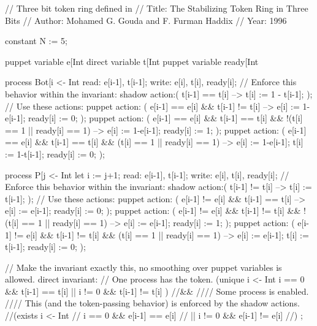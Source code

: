 \begin{code}
// Three bit token ring defined in
// Title: The Stabilizing Token Ring in Three Bits
// Author: Mohamed G. Gouda and F. Furman Haddix
// Year: 1996

constant N := 5;

puppet variable e[Int %
direct variable t[Int %
puppet variable ready[Int %

process Bot[i <- Int %
{
  read:  e[i-1], t[i-1];
  write: e[i], t[i], ready[i];
  // Enforce this behavior within the invariant:
  shadow action:( t[i-1] == t[i] --> t[i] := 1 - t[i-1]; );
  // Use these actions:
  puppet action:
    ( e[i-1] == e[i] && t[i-1] != t[i]
      --> e[i] := 1-e[i-1]; ready[i] := 0;
    );
  puppet action:
    ( e[i-1] == e[i] && t[i-1] == t[i] && !(t[i] == 1 || ready[i] == 1)
      --> e[i] := 1-e[i-1]; ready[i] := 1;
    );
  puppet action:
    ( e[i-1] == e[i] && t[i-1] == t[i] &&  (t[i] == 1 || ready[i] == 1)
      --> e[i] := 1-e[i-1]; t[i] := 1-t[i-1]; ready[i] := 0;
    );
}

process P[j <- Int %
{
  let i := j+1;
  read:  e[i-1], t[i-1];
  write: e[i], t[i], ready[i];
  // Enforce this behavior within the invariant:
  shadow action:( t[i-1] != t[i] --> t[i] := t[i-1]; );
  // Use these actions:
  puppet action:
    ( e[i-1] != e[i] && t[i-1] == t[i]
      --> e[i] := e[i-1]; ready[i] := 0;
    );
  puppet action:
    ( e[i-1] != e[i] && t[i-1] != t[i] && !(t[i] == 1 || ready[i] == 1)
      --> e[i] := e[i-1]; ready[i] := 1;
    );
  puppet action:
    ( e[i-1] != e[i] && t[i-1] != t[i] &&  (t[i] == 1 || ready[i] == 1)
      --> e[i] := e[i-1]; t[i] := t[i-1]; ready[i] := 0;
    );
}

// Make the invariant exactly this, no smoothing over puppet variables is allowed.
direct invariant:
  // One process has the token.
  (unique i <- Int %
      i == 0 && t[i-1] == t[i]
   || i != 0 && t[i-1] != t[i]
  )
  //&&
  //// Some process is enabled.
  //// This (and the token-passing behavior) is enforced by the shadow actions.
  //(exists i <- Int %
  //    i == 0 && e[i-1] == e[i]
  // || i != 0 && e[i-1] != e[i]
  //)
  ;
\end{code}



